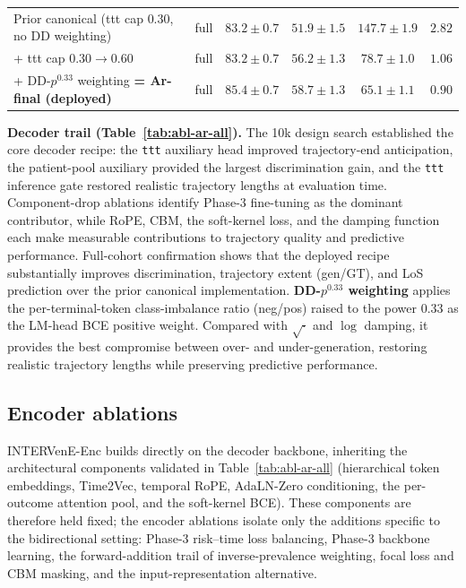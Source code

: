 \begin{table}[h]
\begin{tabular}{llcccc}
\midrule
Prior canonical (ttt cap $0.30$, no DD weighting)       & full & $83.2{\pm}0.7$          & $51.9{\pm}1.5$          & $147.7{\pm}1.9$         & $2.82$ \\
\quad + ttt cap $0.30{\to}0.60$            & full & $83.2{\pm}0.7$          & $56.2{\pm}1.3$          & $78.7{\pm}1.0$          & $1.06$ \\
\quad + DD-$p^{0.33}$ weighting \textbf{= Ar-final (deployed)} & full & $\mathbf{85.4{\pm}0.7}$ & $\mathbf{58.7{\pm}1.3}$ & $\mathbf{65.1{\pm}1.1}$ & $\mathbf{0.90}$ \\
\bottomrule
\end{tabular}
\end{table}

\textbf{Decoder trail (Table~\ref{tab:abl-ar-all}).}
The 10k design search established the core decoder recipe: the \texttt{ttt} auxiliary head improved trajectory-end anticipation, the patient-pool auxiliary provided the largest discrimination gain, and the \texttt{ttt} inference gate restored realistic trajectory lengths at evaluation time. Component-drop ablations identify Phase-3 fine-tuning as the dominant contributor, while RoPE, CBM, the soft-kernel loss, and the damping function each make measurable contributions to trajectory quality and predictive performance. Full-cohort confirmation shows that the deployed recipe substantially improves discrimination, trajectory extent (gen/GT), and LoS prediction over the prior canonical implementation. \textbf{DD-$p^{0.33}$ weighting} applies the per-terminal-token class-imbalance ratio (neg/pos) raised to the power $0.33$ as the LM-head BCE positive weight. Compared with $\sqrt{\cdot}$ and $\log$ damping, it provides the best compromise between over- and under-generation, restoring realistic trajectory lengths while preserving predictive performance.

\subsection{Encoder ablations}

INTERVenE-Enc builds directly on the decoder backbone, inheriting the architectural components validated in Table~\ref{tab:abl-ar-all} (hierarchical token embeddings, Time2Vec, temporal RoPE, AdaLN-Zero conditioning, the per-outcome attention pool, and the soft-kernel BCE). These components are therefore held fixed; the encoder ablations isolate only the additions specific to the bidirectional setting: Phase-3 risk--time loss balancing, Phase-3 backbone learning, the forward-addition trail of inverse-prevalence weighting, focal loss and CBM masking, and the input-representation alternative.

